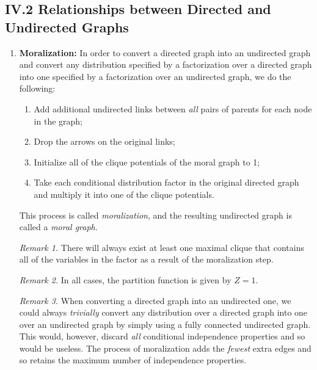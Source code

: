 \documentclass[12pt]{article}
\begin{document}
\subsection*{IV.2 Relationships between Directed and Undirected Graphs}

\begin{enumerate}[label=\textbf{\arabic*.}]

	\item \textbf{Moralization:} In order to convert a directed graph into an undirected graph and convert any distribution specified by a factorization over a directed graph into one specified by a factorization over an undirected graph, we do the following: 
	\begin{enumerate}
		\item Add additional undirected links between \emph{all} pairs of parents for each node in the graph; 
		\item Drop the arrows on the original links; 
		\item Initialize all of the clique potentials of the moral graph to 1; 
		\item Take each conditional distribution factor in the original directed graph and multiply it into one of the clique potentials. 
	\end{enumerate}
	This process is called \textit{moralization}, and the resulting undirected graph is called a \textit{moral graph}. 
	
	\textit{Remark 1.} There will always exist at least one maximal clique that contains all of the variables in the factor as a result of the moralization step. 
	
	\textit{Remark 2.} In all cases, the partition function is given by $Z = 1$. 
	
	\textit{Remark 3.} When converting a directed graph into an undirected one, we could always \emph{trivially} convert any distribution over a directed graph into one over an undirected graph by simply using a fully connected undirected graph. This would, however, discard \emph{all} conditional independence properties and so would be useless. The process of moralization adds the \emph{fewest} extra edges and so retains the maximum number of independence properties. 
	

\end{enumerate}
\end{document}

